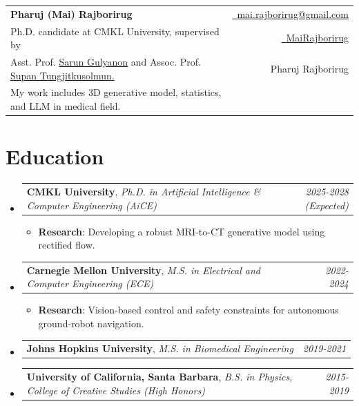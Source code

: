 \documentclass[a4paper,10pt]{article}
\makeatletter
\renewcommand{\small}{\fontsize{9}{10.6}\selectfont}
\newcommand{\resumeRow}[3]{
\vspace{0.3mm}\item
    \begin{tabular*}{\linewidth}[t]{l@{\extracolsep{\fill}}r@{}}
        \textbf{#1}#2 & \textit{\footnotesize{#3}}
    \end{tabular*}%
    \vspace{-2.4mm}\ignorespaces
}
\newcommand{\resumeSubHeadingListStart}{\begin{itemize}[leftmargin=*,labelsep=0mm]}
\newcommand{\resumeItemListStart}{\begin{justify}\begin{itemize}[leftmargin=3ex, rightmargin=2ex, noitemsep,labelsep=1.2mm,itemsep=0mm]\small}
\newcommand{\resumeSubHeadingListEnd}{\end{itemize}\vspace{0mm}}
\newcommand{\resumeItemListEnd}{\end{itemize}\end{justify}\vspace{-2mm}}
\newcommand{\name}{Pharuj (Mai) Rajborirug}
\newcommand{\emaila}{mai.rajborirug@gmail.com}
\makeatother
\begin{document}
\selectfont

\parbox{\dimexpr\linewidth\relax}{
\begin{tabularx}{\linewidth}{L r}
  \textbf{\huge \name} & \href{mailto:\emaila}{\raisebox{0.0\height}{\footnotesize \faEnvelope}\ {\emaila}}\\
  {Ph.D. candidate at CMKL University, supervised by} & \href{https://github.com/MaiRajborirug}{\raisebox{0.0\height}{\footnotesize \faGithub}\ {MaiRajborirug}}\\
  {Asst. Prof. \href{https://sgulyano.github.io/}{Sarun Gulyanon} and Assoc. Prof. \href{https://engineering.cmu.edu/thailand/directory/bios/tungjitkusolmun-supan.html}{Supan Tungjitkusolmun.}} & \href{https://www.linkedin.com/in/pharuj-rajborirug/}{\raisebox{0.0\height}{\footnotesize \faLinkedin}}\  \href{https://scholar.google.com/citations?user=evQ86fwAAAAJ\&hl=en\&oi=ao}{\raisebox{0.0\height}{\footnotesize \faGraduationCap}} Pharuj Rajborirug\\
  {My work includes 3D generative model, statistics, and LLM in medical field.} & \\
\end{tabularx}
}

\vspace{-3.5mm}

\section{\textbf{Education}}
  \resumeSubHeadingListStart
    \resumeRow
      {CMKL University}{, \textit{Ph.D. in Artificial Intelligence \& Computer Engineering (AiCE)}}{2025-2028 (Expected)}
      \vspace{-1.5mm}
      \resumeItemListStart
      \item  \textbf{Research}: Developing a robust MRI-to-CT generative model using rectified flow.
      \resumeItemListEnd
      \vspace{-1.5mm}
    \resumeRow
      {Carnegie Mellon University}{, \textit{M.S. in Electrical and Computer Engineering (ECE)}}{2022-2024}
      \vspace{-1.5mm}
      \resumeItemListStart
      \item  \textbf{Research}: Vision-based control and safety constraints for autonomous ground-robot navigation.
      \resumeItemListEnd
      \vspace{-1.5mm}
    \resumeRow
      {Johns Hopkins University}{, \textit{M.S. in Biomedical Engineering}}{2019-2021}
    \resumeRow
      {University of California, Santa Barbara}{, \textit{B.S. in Physics, College of Creative Studies (High Honors)}}{2015-2019}
  \resumeSubHeadingListEnd
\vspace{-4mm}
\end{document}
